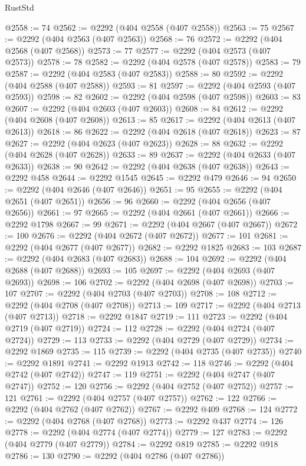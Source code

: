 \begin{lexlean}{RustStd}
\begin{coremodule}
@2558 := 74
@2562 := @2292 (@404 @2558 (@407 @2558))
@2563 := 75
@2567 := @2292 (@404 @2563 (@407 @2563))
@2568 := 76
@2572 := @2292 (@404 @2568 (@407 @2568))
@2573 := 77
@2577 := @2292 (@404 @2573 (@407 @2573))
@2578 := 78
@2582 := @2292 (@404 @2578 (@407 @2578))
@2583 := 79
@2587 := @2292 (@404 @2583 (@407 @2583))
@2588 := 80
@2592 := @2292 (@404 @2588 (@407 @2588))
@2593 := 81
@2597 := @2292 (@404 @2593 (@407 @2593))
@2598 := 82
@2602 := @2292 (@404 @2598 (@407 @2598))
@2603 := 83
@2607 := @2292 (@404 @2603 (@407 @2603))
@2608 := 84
@2612 := @2292 (@404 @2608 (@407 @2608))
@2613 := 85
@2617 := @2292 (@404 @2613 (@407 @2613))
@2618 := 86
@2622 := @2292 (@404 @2618 (@407 @2618))
@2623 := 87
@2627 := @2292 (@404 @2623 (@407 @2623))
@2628 := 88
@2632 := @2292 (@404 @2628 (@407 @2628))
@2633 := 89
@2637 := @2292 (@404 @2633 (@407 @2633))
@2638 := 90
@2642 := @2292 (@404 @2638 (@407 @2638))
@2643 := @2292 @458
@2644 := @2292 @1545
@2645 := @2292 @479
@2646 := 94
@2650 := @2292 (@404 @2646 (@407 @2646))
@2651 := 95
@2655 := @2292 (@404 @2651 (@407 @2651))
@2656 := 96
@2660 := @2292 (@404 @2656 (@407 @2656))
@2661 := 97
@2665 := @2292 (@404 @2661 (@407 @2661))
@2666 := @2292 @1798
@2667 := 99
@2671 := @2292 (@404 @2667 (@407 @2667))
@2672 := 100
@2676 := @2292 (@404 @2672 (@407 @2672))
@2677 := 101
@2681 := @2292 (@404 @2677 (@407 @2677))
@2682 := @2292 @1825
@2683 := 103
@2687 := @2292 (@404 @2683 (@407 @2683))
@2688 := 104
@2692 := @2292 (@404 @2688 (@407 @2688))
@2693 := 105
@2697 := @2292 (@404 @2693 (@407 @2693))
@2698 := 106
@2702 := @2292 (@404 @2698 (@407 @2698))
@2703 := 107
@2707 := @2292 (@404 @2703 (@407 @2703))
@2708 := 108
@2712 := @2292 (@404 @2708 (@407 @2708))
@2713 := 109
@2717 := @2292 (@404 @2713 (@407 @2713))
@2718 := @2292 @1847
@2719 := 111
@2723 := @2292 (@404 @2719 (@407 @2719))
@2724 := 112
@2728 := @2292 (@404 @2724 (@407 @2724))
@2729 := 113
@2733 := @2292 (@404 @2729 (@407 @2729))
@2734 := @2292 @1869
@2735 := 115
@2739 := @2292 (@404 @2735 (@407 @2735))
@2740 := @2292 @1891
@2741 := @2292 @1913
@2742 := 118
@2746 := @2292 (@404 @2742 (@407 @2742))
@2747 := 119
@2751 := @2292 (@404 @2747 (@407 @2747))
@2752 := 120
@2756 := @2292 (@404 @2752 (@407 @2752))
@2757 := 121
@2761 := @2292 (@404 @2757 (@407 @2757))
@2762 := 122
@2766 := @2292 (@404 @2762 (@407 @2762))
@2767 := @2292 @409
@2768 := 124
@2772 := @2292 (@404 @2768 (@407 @2768))
@2773 := @2292 @437
@2774 := 126
@2778 := @2292 (@404 @2774 (@407 @2774))
@2779 := 127
@2783 := @2292 (@404 @2779 (@407 @2779))
@2784 := @2292 @819
@2785 := @2292 @918
@2786 := 130
@2790 := @2292 (@404 @2786 (@407 @2786))

\end{coremodule}
\end{lexlean}
